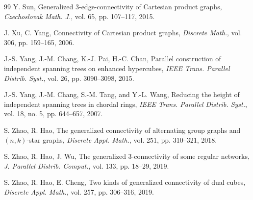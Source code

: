 \documentclass[final]{dmtcs-episciences}
\begin{document}
\begin{thebibliography}{99}
Y. Sun, Generalized $3$-edge-connectivity of Cartesian product
graphs, \emph{Czechoslovak Math. J.}, vol. 65, pp. 107--117, 2015.

J. Xu, C. Yang, Connectivity of Cartesian product graphs,
\emph{Discrete Math.}, vol. 306, pp. 159--165, 2006.

J.-S. Yang, J.-M. Chang, K.-J. Pai, H.-C. Chan, Parallel
construction of independent spanning trees on enhanced hypercubes,
\emph{IEEE Trans. Parallel Distrib. Syst.}, vol. 26, pp. 3090--3098,
2015.

J.-S. Yang, J.-M. Chang, S.-M. Tang, and Y.-L. Wang, Reducing the
height of independent spanning trees in chordal rings, \emph{IEEE
Trans. Parallel Distrib. Syst.}, vol. 18, no. 5, pp. 644--657, 2007.

S. Zhao, R. Hao, The generalized connectivity of alternating group
graphs and $(n,k)$-star graphs, \emph{Discrete Appl. Math.}, vol.
251, pp. 310--321, 2018.

S. Zhao, R. Hao, J. Wu, The generalized $3$-connectivity of some
regular networks, \emph{J. Parallel Distrib. Comput.}, vol. 133, pp.
18--29, 2019.

S. Zhao, R. Hao, E. Cheng, Two kinds of generalized connectivity of
dual cubes, \emph{Discrete Appl. Math.}, vol. 257, pp. 306--316,
2019.


\end{thebibliography}
\end{document}
